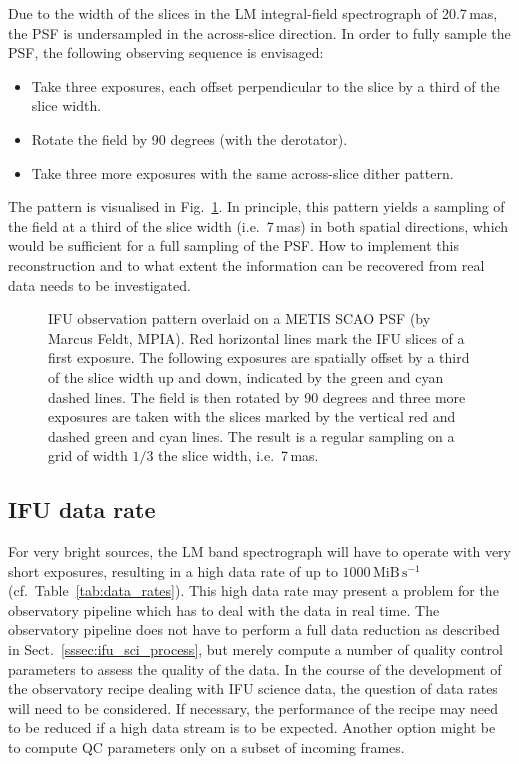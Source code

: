 Due to the width of the slices in the LM integral-field spectrograph
of 20.7\,mas, the PSF is undersampled in the across-slice direction.
In order to fully sample the PSF, the following observing sequence is
envisaged:
\begin{itemize}
\item Take three exposures, each offset perpendicular to the slice by
  a third of the slice width.
\item Rotate the field by 90 degrees (with the derotator).
\item Take three more exposures with the same across-slice dither
  pattern.
\end{itemize}
The pattern is visualised in Fig.~\ref{fig:ifu_pattern}. In principle,
this pattern yields a sampling of the field at a third of the slice
width (i.e.~7\,mas) in both spatial directions, which would be
sufficient for a full sampling of the PSF. How to implement this
reconstruction and to what extent the information can be recovered
from real data needs to be investigated.

\begin{figure}[hb]
  \centering
  \caption[IFU dithering and rotation pattern]{%
    IFU observation pattern overlaid on a METIS SCAO PSF (by Marcus
    Feldt, MPIA). Red horizontal lines mark the IFU slices of a first
    exposure. The following exposures are spatially offset by a third
    of the slice width up and down, indicated by the green and cyan
    dashed lines. The field is then rotated by 90 degrees and three
    more exposures are taken with the slices marked by the vertical
    red and dashed green and cyan lines. The result is a regular
    sampling on a grid of width $1/3$ the slice width, i.e.~7\,mas.}
  \label{fig:ifu_pattern}
\end{figure}

\subsection{IFU data rate}\label{ssec:criticalifudatarate}

\label{ssec:ifu_data_rate}

For very bright sources, the LM band spectrograph will have to operate
with very short exposures, resulting in a high data rate of up to
$1000\,\mathrm{MiB\,s^{-1}}$ (cf.~Table~\ref{tab:data_rates}). This
high data rate may present a problem for the observatory pipeline
which has to deal with the data in real time.  The observatory
pipeline does not have to perform a full data reduction as described
in Sect.~\ref{sssec:ifu_sci_process}, but merely compute a number of
quality control parameters to assess the quality of the data. In the
course of the development of the observatory recipe dealing with IFU
science data, the question of data rates will need to be
considered. If necessary, the performance of the recipe may need to be
reduced if a high data stream is to be expected. Another option might
be to compute QC parameters only on a subset of incoming frames.

